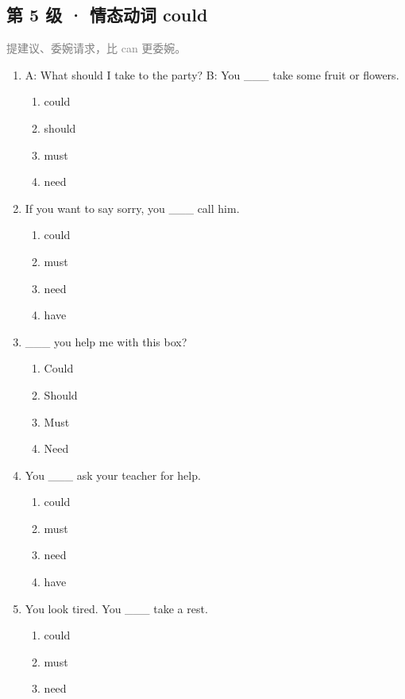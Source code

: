 \documentclass[11pt,a4paper]{ctexart}
\begin{document}
\subsection*{第 5 级 · 情态动词 could}
\noindent\textcolor{gray}{提建议、委婉请求，比 can 更委婉。}\par\smallskip
\begin{enumerate}[leftmargin=*,itemsep=4pt]
\item A: What should I take to the party? B: You \_\_\_ take some fruit or flowers.
\begin{enumerate}[label=\Alph*.,leftmargin=2em,itemsep=1pt,topsep=2pt]
\item could
\item should
\item must
\item need
\end{enumerate}
\item If you want to say sorry, you \_\_\_ call him.
\begin{enumerate}[label=\Alph*.,leftmargin=2em,itemsep=1pt,topsep=2pt]
\item could
\item must
\item need
\item have
\end{enumerate}
\item \_\_\_ you help me with this box?
\begin{enumerate}[label=\Alph*.,leftmargin=2em,itemsep=1pt,topsep=2pt]
\item Could
\item Should
\item Must
\item Need
\end{enumerate}
\item You \_\_\_ ask your teacher for help.
\begin{enumerate}[label=\Alph*.,leftmargin=2em,itemsep=1pt,topsep=2pt]
\item could
\item must
\item need
\item have
\end{enumerate}
\item You look tired. You \_\_\_ take a rest.
\begin{enumerate}[label=\Alph*.,leftmargin=2em,itemsep=1pt,topsep=2pt]
\item could
\item must
\item need

\end{enumerate}
\end{enumerate}
\end{document}
